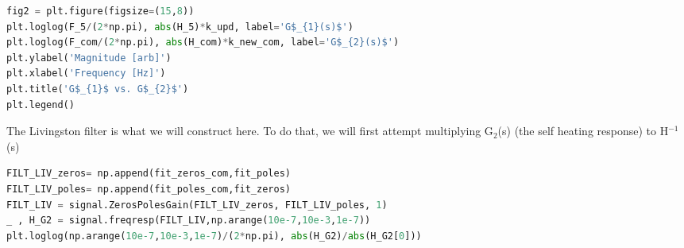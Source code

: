 


\begin{spacing}{1.2} \begin{lstlisting}[frame=single,language=Python]
fig2 = plt.figure(figsize=(15,8))
plt.loglog(F_5/(2*np.pi), abs(H_5)*k_upd, label='G$_{1}(s)$')
plt.loglog(F_com/(2*np.pi), abs(H_com)*k_new_com, label='G$_{2}(s)$')
plt.ylabel('Magnitude [arb]')
plt.xlabel('Frequency [Hz]')
plt.title('G$_{1}$ vs. G$_{2}$')
plt.legend()
\end{lstlisting} \end{spacing}



The Livingston filter is what we will construct here. To do that, we will first attempt multiplying G\(_{2}\)(s) (the self heating response) to H\(^{-1}\)(s)

\begin{spacing}{1.2} \begin{lstlisting}[frame=single,language=Python]
FILT_LIV_zeros= np.append(fit_zeros_com,fit_poles)
FILT_LIV_poles= np.append(fit_poles_com,fit_zeros)
FILT_LIV = signal.ZerosPolesGain(FILT_LIV_zeros, FILT_LIV_poles, 1)
_ , H_G2 = signal.freqresp(FILT_LIV,np.arange(10e-7,10e-3,1e-7))
plt.loglog(np.arange(10e-7,10e-3,1e-7)/(2*np.pi), abs(H_G2)/abs(H_G2[0]))
\end{lstlisting} \end{spacing}


